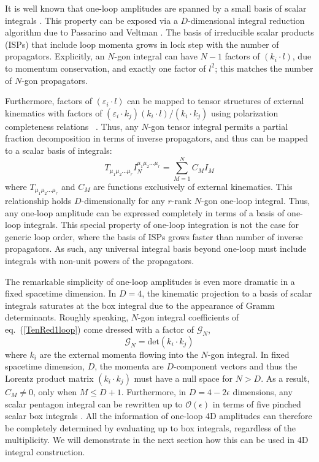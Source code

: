 \documentclass[11pt,letter]{article}
\def\eqn#1{eq.~(\ref{#1})}
\begin{document}
It is well known that one-loop amplitudes are spanned by a small basis of scalar integrals \cite{Forde:2007mi,Badger:2008cm,ElvangHuangReview}. This property can be exposed via a $D$-dimensional integral reduction algorithm due to Passarino and Veltman \cite{Passarino:1978jh}. The basis of irreducible scalar products (ISPs) that include loop momenta grows in lock step with the number of propagators. Explicitly, an $N$-gon integral can have $N-1$ factors of $(k_i\cdot l)$, due to momentum conservation, and exactly one factor of $l^2$; this matches the number of $N$-gon propagators. 

Furthermore, factors of $(\varepsilon_i\cdot l)$ can be mapped to tensor structures of external kinematics with factors of $(\varepsilon_i \cdot k_j)(k_i  \cdot l)/(k_i \cdot k_j)$ using polarization completeness relations~\cite{Bern:2017tuc} . Thus, any $N$-gon tensor integral permits a partial fraction decomposition in terms of inverse propagators, and thus can be mapped to a scalar basis of integrals:
\begin{equation}\label{TenRed1loop}
T_{\mu_1\mu_2...\mu_r} I_N^{\mu_1\mu_2...\mu_r} = \sum_{M=1}^N C_M I_M
\end{equation}
where $T_{\mu_1\mu_2...\mu_r}$ and $C_M$ are functions exclusively of external kinematics. This relationship holds $D$-dimensionally for any $r$-rank $N$-gon one-loop integral. Thus, any one-loop amplitude can be expressed completely in terms of a basis of one-loop integrals. This special property of one-loop integration is {not} the case for generic loop order, where the basis of ISPs grows faster than number of inverse propagators. As such, any universal integral basis beyond one-loop must include integrals with non-unit powers of the propagators.  

The remarkable simplicity of one-loop amplitudes is even more dramatic in a fixed spacetime dimension. In $D=4$, the kinematic projection to a basis of scalar integrals saturates at the box integral due to the appearance of Gramm determinants. Roughly speaking, $N$-gon integral coefficients of \eqn{TenRed1loop} come dressed with a factor of $\mathcal{G}_N$,
\begin{equation}
\mathcal{G}_N = \text{det} (k_i \cdot k_j)
\end{equation}
where $k_i$ are the external momenta flowing into the $N$-gon integral. In fixed spacetime dimension, $D$, the momenta are $D$-component vectors and thus the Lorentz product matrix $(k_i \cdot k_j)$ must have a null space for $N>D$. As a result, $C_M \neq 0$, only when $M\leq D+1$. Furthermore, in $D=4-2\epsilon$ dimensions, any scalar pentagon integral can be rewritten up to $\mathcal{O}(\epsilon)$ in terms of five pinched scalar box integrals \cite{Bern:1993kr}. All the information of one-loop 4D amplitudes can therefore be completely determined by evaluating up to box integrals, regardless of the multiplicity. We will demonstrate in the next section how this can be used in 4D integral construction.  
\end{document}
